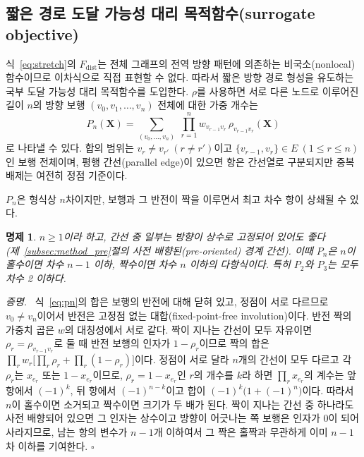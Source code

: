 \documentclass[twocolumn,a4paper]{article}
\newtheorem{proposition}[theorem]{명제}
\newenvironment{proof}{\par\noindent\textit{증명.}\ }{\hfill\(\square\)\par\medskip}
\begin{document}
\subsection{짧은 경로 도달 가능성 대리 목적함수(surrogate objective)} \label{subsec:model_hop}

식~\eqref{eq:stretch}의 \(F_{\mathrm{dist}}\)는 전체 그래프의 전역 방향 패턴에 의존하는 비국소(nonlocal) 함수이므로 이차식으로 직접 표현할 수 없다. 따라서 짧은 방향 경로 형성을 유도하는 국부 도달 가능성 대리 목적함수를 도입한다. \(\rho\)를 사용하면 서로 다른 노드로 이루어진 길이 \(n\)의 방향 보행 \((v_0,v_1,\dots,v_n)\) 전체에 대한 가중 개수는
\begin{equation}
P_n(\mathbf{X})=\sum_{(v_0,\dots,v_n)}\;\prod_{r=1}^{n}w_{v_{r-1}v_r}\,\rho_{v_{r-1}v_r}(\mathbf{X})
\label{eq:pn}
\end{equation}
로 나타낼 수 있다. 합의 범위는 \(v_r\neq v_{r'}\ (r\neq r')\)이고 \(\{v_{r-1},v_r\}\in E\ (1\leq r\leq n)\)인 보행 전체이며, 평행 간선(parallel edge)이 있으면 항은 간선열로 구분되지만 중복 배제는 여전히 정점 기준이다.

\(P_n\)은 형식상 \(n\)차이지만, 보행과 그 반전이 짝을 이루면서 최고 차수 항이 상쇄될 수 있다.

\begin{proposition} \label{prop:deg}
\(n\geq1\)이라 하고, 간선 중 일부는 방향이 상수로 고정되어 있어도 좋다(제~\ref{subsec:method_pre}절의 사전 배향된(pre-oriented) 경계 간선). 이때 \(P_n\)은 \(n\)이 홀수이면 차수 \(n-1\) 이하, 짝수이면 차수 \(n\) 이하의 다항식이다. 특히 \(P_2\)와 \(P_3\)는 모두 차수 2 이하다.
\end{proposition}

\begin{proof}
식~\eqref{eq:pn}의 합은 보행의 반전에 대해 닫혀 있고, 정점이 서로 다르므로 \(v_0\neq v_n\)이어서 반전은 고정점 없는 대합(fixed-point-free involution)이다. 반전 짝의 가중치 곱은 \(w\)의 대칭성에서 서로 같다. 짝이 지나는 간선이 모두 자유이면 \(\rho_r=\rho_{v_{r-1}v_r}\)로 둘 때 반전 보행의 인자가 \(1-\rho_r\)이므로 짝의 합은 \(\prod_rw_r\bigl[\prod_r\rho_r+\prod_r(1-\rho_r)\bigr]\)이다. 정점이 서로 달라 \(n\)개의 간선이 모두 다르고 각 \(\rho_r\)는 \(x_{e_r}\) 또는 \(1-x_{e_r}\)이므로, \(\rho_r=1-x_{e_r}\)인 \(r\)의 개수를 \(k\)라 하면 \(\prod_rx_{e_r}\)의 계수는 앞 항에서 \((-1)^k\), 뒤 항에서 \((-1)^{n-k}\)이고 합이 \((-1)^k\bigl(1+(-1)^n\bigr)\)이다. 따라서 \(n\)이 홀수이면 소거되고 짝수이면 크기가 두 배가 된다. 짝이 지나는 간선 중 하나라도 사전 배향되어 있으면 그 인자는 상수이고 방향이 어긋나는 쪽 보행은 인자가 0이 되어 사라지므로, 남는 항의 변수가 \(n-1\)개 이하여서 그 짝은 홀짝과 무관하게 이미 \(n-1\)차 이하를 기여한다.
\end{proof}
\end{document}

